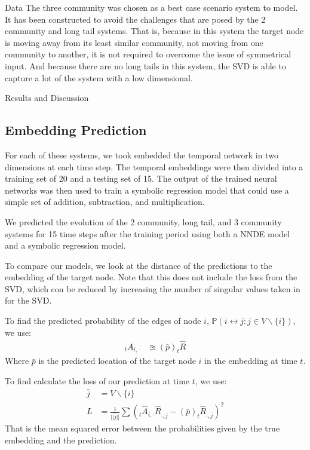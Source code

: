 \documentclass[12pt]{amsart}
\begin{document}
\begin{section}{Data}
    The three community was chosen as a best case scenario system to model. It has been constructed to avoid the challenges that are posed by the 2 community and long tail systems. That is, because in this system the target node is moving away from its least similar community, not moving from one community to another, it is not required to overcome the issue of symmetrical input. And because there are no long tails in this system, the SVD is able to capture a lot of the system with a low dimensional.

\end{section}

\begin{section}{Results and Discussion}
    \subsection{Embedding Prediction}
        For each of these systems, we took embedded the temporal network in two dimensions at each time step. The temporal embeddings were then divided into a training set of 20 and a testing set of 15. The output of the trained neural networks was then used to train a symbolic regression model that could use a simple set of addition, subtraction, and multiplication. 

        We predicted the evolution of the 2 community, long tail, and 3 community systems for 15 time steps after the training period using both a NNDE model and a symbolic regression model.

        To compare our models, we look at the distance of the predictions to the embedding of the target node. Note that this does not include the loss from the SVD, which con be reduced by increasing the number of singular values taken in for the SVD.
        
        To find the predicted probability of the edges of node $i$, $\mathbb{P}(i \leftrightarrow j:j\in V\smallsetminus \{i\})$, we use: 
        \begin{align}
            _tA_{i,\cdot} &\approxeq (\bar p) _t\hat R
        \end{align}
        Where $\bar p$ is the predicted location of the target node $i$ in the embedding at time $t$.

        To find calculate the loss of our prediction at time $t$, we use:
        \begin{align}
            \bar j &= V \smallsetminus \{i\}  \\
            L &= \frac{1}{||\bar j||}\sum{(_t\hat A_{i,\cdot} \hat R_{\cdot,\bar j} - (\bar p) _t\hat R_{\cdot,\bar j})^2}
        \end{align}
        That is the mean squared error between the probabilities given by the true embedding and the prediction.
        

\end{section}
\end{document}
